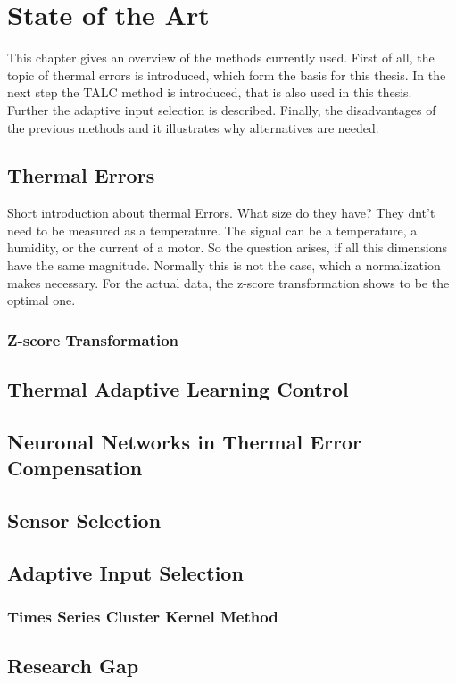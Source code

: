 \chapter{State of the Art}
\label{chp:stateoftheart}

This chapter gives an overview of the methods currently used. First of all, the topic of thermal errors is introduced, which form the basis for this thesis. In the next step the TALC method is introduced, that is also used in this thesis. Further the adaptive input selection is described. Finally, the disadvantages of the previous methods and it illustrates why alternatives are needed.

\section{Thermal Errors}
\label{sec:thermalerrors}

Short introduction about thermal Errors. What size do they have? They dnt't need  to be measured as a temperature. The signal can be a temperature, a humidity, or the current of a motor. So the question arises, if all this dimensions have the same magnitude. Normally this is not the case, which a normalization makes necessary. For the actual data, the z-score transformation shows to be the optimal one.

\subsection{Z-score Transformation}
\label{sec:z_score_transoformation}




\section{Thermal Adaptive Learning Control}
\label{sec:TALC}

\section{Neuronal Networks in Thermal Error Compensation}
\label{sec:neuronal_networks}


\section{Sensor Selection}
\label{sec:sensor_selectiom}




\section{Adaptive Input Selection}
\label{sec:Adaptiveinputselection}




\subsection{Times Series Cluster Kernel Method}
\label{sec:introTCK}





\section{Research Gap}
\label{sec:researchgap}




